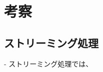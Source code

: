 \documentclass[../../main]{subfiles}
\begin{document}
    \section{考察}\label{sec:consideration}

    \subsection{ストリーミング処理}\label{subsec:consideration-streaming}

    - ストリーミング処理では、

    \clearpage
\end{document}
